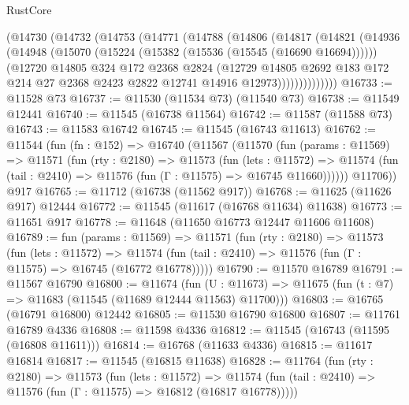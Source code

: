 \begin{lexlean}{RustCore}
\begin{coremodule}
        (@14730
          (@14732
            (@14753
              (@14771
                (@14788
                  (@14806
                    (@14817
                      (@14821
                        (@14936
                          (@14948
                            (@15070 (@15224 (@15382 (@15536 (@15545 (@16690 @16694))))))
                            (@12720
                              @14805
                              @324
                              @172
                              @2368
                              @2824
                              (@12729
                                @14805
                                @2692
                                @183
                                @172
                                @214
                                @27
                                @2368
                                @2423
                                @2822
                                @12741
                                @14916
                                @12973))))))))))))))
@16733 := @11528 @73
@16737 := @11530 (@11534 @73) (@11540 @73)
@16738 := @11549 @12441
@16740 := @11545 (@16738 @11564)
@16742 := @11587 (@11588 @73)
@16743 := @11583 @16742
@16745 := @11545 (@16743 @11613)
@16762 := @11544
    (fun (fn : @152) =>
    @16740
      (@11567
        (@11570
          (fun (params : @11569) =>
          @11571
            (fun (rty : @2180) =>
            @11573
              (fun (lets : @11572) =>
              @11574 (fun (tail : @2410) => @11576 (fun (Γ : @11575) => @16745 @11660))))))
        @11706))
    @917
@16765 := @11712 (@16738 (@11562 @917))
@16768 := @11625 (@11626 @917) @12444
@16772 := @11545 (@11617 (@16768 @11634) @11638)
@16773 := @11651 @917
@16778 := @11648 (@11650 @16773 @12447 @11606 @11608)
@16789 := fun (params : @11569) =>
  @11571
    (fun (rty : @2180) =>
    @11573
      (fun (lets : @11572) =>
      @11574 (fun (tail : @2410) => @11576 (fun (Γ : @11575) => @16745 (@16772 @16778)))))
@16790 := @11570 @16789
@16791 := @11567 @16790
@16800 := @11674
    (fun (U : @11673) => @11675 (fun (t : @7) => @11683 (@11545 (@11689 @12444 @11563) @11700)))
@16803 := @16765 (@16791 @16800) @12442
@16805 := @11530 @16790 @16800
@16807 := @11761 @16789 @4336
@16808 := @11598 @4336
@16812 := @11545 (@16743 (@11595 (@16808 @11611)))
@16814 := @16768 (@11633 @4336)
@16815 := @11617 @16814
@16817 := @11545 (@16815 @11638)
@16828 := @11764
    (fun (rty : @2180) =>
    @11573
      (fun (lets : @11572) =>
      @11574 (fun (tail : @2410) => @11576 (fun (Γ : @11575) => @16812 (@16817 @16778)))))

\end{coremodule}
\end{lexlean}
